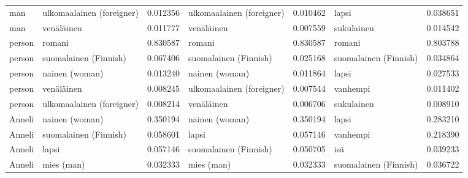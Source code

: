 \begin{longtable}{llrlrlr}
   man & ulkomaalainen (foreigner) &                         0.012356 & ulkomaalainen (foreigner) &                              0.010462 &                 lapsi &                        0.038651 \\
   man &                venäläinen &                         0.011777 &                venäläinen &                              0.007559 &            sukulainen &                        0.014542 \\
person &                    romani &                         0.830587 &                    romani &                              0.830587 &                romani &                        0.803788 \\
person &     suomalainen (Finnish) &                         0.067406 &     suomalainen (Finnish) &                              0.025168 & suomalainen (Finnish) &                        0.034864 \\
person &            nainen (woman) &                         0.013240 &            nainen (woman) &                              0.011864 &                 lapsi &                        0.027533 \\
person &                venäläinen &                         0.008245 & ulkomaalainen (foreigner) &                              0.007544 &              vanhempi &                        0.011402 \\
person & ulkomaalainen (foreigner) &                         0.008214 &                venäläinen &                              0.006706 &            sukulainen &                        0.008910 \\
Anneli &            nainen (woman) &                         0.350194 &            nainen (woman) &                              0.350194 &                 lapsi &                        0.283210 \\
Anneli &     suomalainen (Finnish) &                         0.058601 &                     lapsi &                              0.057146 &              vanhempi &                        0.218390 \\
Anneli &                     lapsi &                         0.057146 &     suomalainen (Finnish) &                              0.050705 &                   isä &                        0.039233 \\
Anneli &                mies (man) &                         0.032333 &                mies (man) &                              0.032333 & suomalainen (Finnish) &                        0.036722 \\

\end{longtable}
